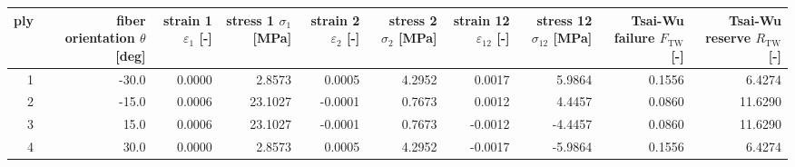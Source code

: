 \begin{tabular}{rrrrrrrrrr}
\toprule
ply & fiber orientation $\theta$ [deg] & strain 1 $\varepsilon_1$ [-] & stress 1 $\sigma_1$ [MPa] & strain 2 $\varepsilon_2$ [-] & stress 2 $\sigma_2$ [MPa] & strain 12 $\varepsilon_{12}$ [-] & stress 12 $\sigma_{12}$ [MPa] & Tsai-Wu failure $F_\mathrm{TW}$ [-] & Tsai-Wu reserve $R_\mathrm{TW}$ [-] \\
\midrule
  1 &                            -30.0 &                       0.0000 &                    2.8573 &                       0.0005 &                    4.2952 &                           0.0017 &                        5.9864 &                              0.1556 &                              6.4274 \\
  2 &                            -15.0 &                       0.0006 &                   23.1027 &                      -0.0001 &                    0.7673 &                           0.0012 &                        4.4457 &                              0.0860 &                             11.6290 \\
  3 &                             15.0 &                       0.0006 &                   23.1027 &                      -0.0001 &                    0.7673 &                          -0.0012 &                       -4.4457 &                              0.0860 &                             11.6290 \\
  4 &                             30.0 &                       0.0000 &                    2.8573 &                       0.0005 &                    4.2952 &                          -0.0017 &                       -5.9864 &                              0.1556 &                              6.4274 \\
\bottomrule
\end{tabular}
